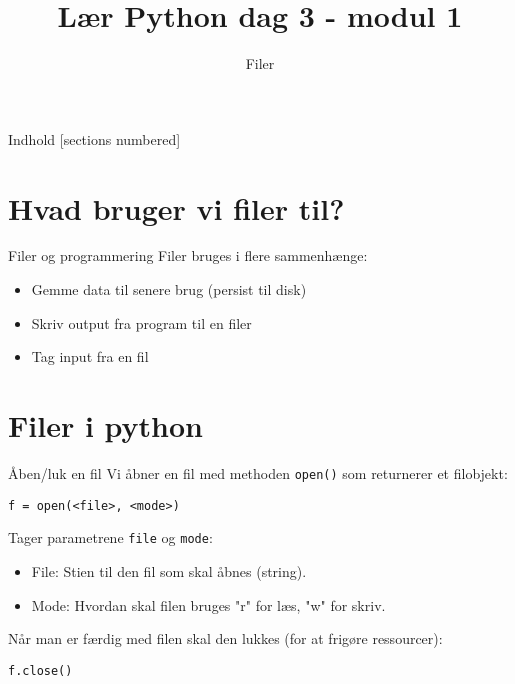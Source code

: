 

\title{Lær Python dag 3 - modul 1}
\subtitle{Filer}



\maketitle

\begin{frame}{Indhold}
  [sections numbered]
  \tableofcontents[hideallsubsections]
\end{frame}

\section{Hvad bruger vi filer til?}

\begin{frame}{Filer og programmering}
	Filer bruges i flere sammenhænge:
	\begin{itemize}
		\item Gemme data til senere brug (persist til disk)
		\item Skriv output fra program til en filer
		\item Tag input fra en fil
	\end{itemize}
\end{frame}

\section{Filer i python}

\begin{frame}[fragile]{Åben/luk en fil}
	Vi åbner en fil med methoden \texttt{open()} som returnerer et filobjekt:
	\begin{lstlisting}[style=python]
f = open(<file>, <mode>)
	\end{lstlisting}
	Tager parametrene \texttt{file} og \texttt{mode}:
	\begin{itemize}
		\item File: Stien til den fil som skal åbnes (string).
		\item Mode: Hvordan skal filen bruges "r" for læs, "w" for skriv.
	\end{itemize}
	Når man er færdig med filen skal den lukkes (for at frigøre ressourcer):
	\begin{lstlisting}[style=python]
f.close()
	\end{lstlisting}
\end{frame}


